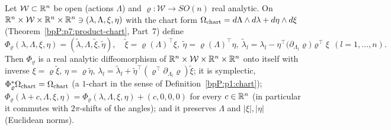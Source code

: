 \begin{proposition}\label{bpP:p9:lift}
Let $\mathcal W\subset\mathbb{R}^n$ be open (actions $\Lambda$) and $\varrho:\mathcal W\to SO(n)$ real analytic. On $\mathbb{R}^n\times\mathcal W\times\mathbb{R}^n\times\mathbb{R}^n\ni(\lambda,\Lambda,\xi,\eta)$ with the chart form $\Omega_{\rm chart}=d\Lambda\wedge d\lambda+d\eta\wedge d\xi$ (Theorem~\ref{bpP:p7:product-chart}, Part~7) define
\[\Phi_\varrho(\lambda,\Lambda,\xi,\eta)=(\tilde\lambda,\Lambda,\tilde\xi,\tilde\eta),\quad\tilde\xi=\varrho(\Lambda)^\top\xi,\ \tilde\eta=\varrho(\Lambda)^\top\eta,\ \tilde\lambda_l=\lambda_l-\eta^\top\big(\partial_{\Lambda_l}\varrho\big)\varrho^\top\xi\ \ (l=1,\dots,n).\]
Then $\Phi_\varrho$ is a real analytic diffeomorphism of $\mathbb{R}^n\times\mathcal W\times\mathbb{R}^n\times\mathbb{R}^n$ onto itself with inverse $\xi=\varrho\tilde\xi$, $\eta=\varrho\tilde\eta$, $\lambda_l=\tilde\lambda_l+\tilde\eta^\top(\varrho^\top\partial_{\Lambda_l}\varrho)\tilde\xi$; it is symplectic, $\Phi_\varrho^*\Omega_{\rm chart}=\Omega_{\rm chart}$ (a $1$-chart in the sense of Definition~\ref{bpP:p1:chart}); $\Phi_\varrho(\lambda+c,\Lambda,\xi,\eta)=\Phi_\varrho(\lambda,\Lambda,\xi,\eta)+(c,0,0,0)$ for every $c\in\mathbb{R}^n$ (in particular it commutes with $2\pi$-shifts of the angles); and it preserves $\Lambda$ and $\lvert\xi\rvert,\lvert\eta\rvert$ (Euclidean norms).
\end{proposition}
